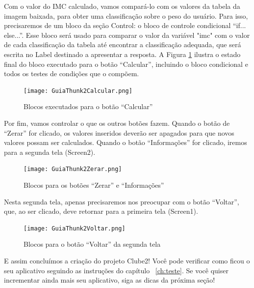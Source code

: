 \documentclass[11pt,fleqn]{book} %
\begin{document}
Com o valor do IMC calculado, vamos compará-lo com os valores da tabela da imagem baixada, para obter uma classificação sobre o peso do usuário. Para isso, precisaremos de um bloco da seção Control: o bloco de controle condicional ``if... else...''. Esse bloco será usado para comparar o valor da variável "imc" com o valor de cada classificação da tabela até encontrar a classificação adequada, que será escrita no Label destinado a apresentar a resposta. A Figura \ref{fig:imcifs} ilustra o estado final do bloco executado para o botão ``Calcular'', incluindo o bloco condicional e todos os testes de condições que o compõem.

\begin{figure}[H]
	\centering
	\texttt{[image: GuiaThunk2Calcular.png]}\hspace{0.2cm}
    \caption{Blocos executados para o botão ``Calcular''}\label{fig:imcifs}

\end{figure} 

Por fim, vamos controlar o que os outros botões fazem. Quando o botão de ``Zerar'' for clicado, os valores inseridos deverão ser apagados para que novos valores possam ser calculados. Quando o botão ``Informações'' for clicado, iremos para a segunda tela (Screen2).

\begin{figure}[H]
	\centering
	\texttt{[image: GuiaThunk2Zerar.png]}\hspace{0.2cm}
    \caption{Blocos para os botões ``Zerar'' e ``Informações''}\label{fig:imczerar}
\end{figure} 



Nesta segunda tela, apenas precisaremos nos preocupar com o botão ``Voltar'', que, ao ser clicado, deve retornar para a primeira tela (Screen1).
 
\begin{figure}[H]
	\centering
	\texttt{[image: GuiaThunk2Voltar.png]}\hspace{0.2cm}
    \caption{Blocos para o botão ``Voltar'' da segunda tela}\label{fig:imcvoltar}
\end{figure} 

 
E assim concluímos a criação do projeto Clube2! Você pode verificar como ficou o seu aplicativo seguindo as instruções do capítulo ~\ref{ch:teste}. Se você quiser incrementar ainda mais seu aplicativo, siga as dicas da próxima seção!
\end{document}

